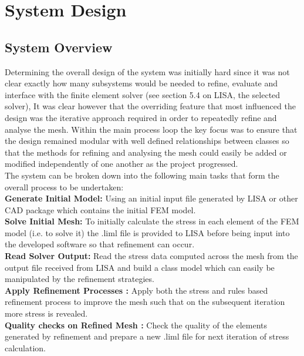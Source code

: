\section{System Design}

\subsection{System Overview}
Determining the overall design of the system was initially hard since it was not clear exactly how many subsystems would be needed to refine, evaluate and interface with the finite element solver (see section 5.4 on LISA, the selected solver), It was clear however that the overriding feature that most influenced the design was the iterative approach required in order to repeatedly refine and analyse the mesh. Within the main process loop the  key focus was to ensure that the design remained modular with well defined relationships between classes so that the methods for refining and analysing the mesh could easily be added or modified independently of one another as the project progressed. \\ 


\noindent
The system can be broken down into the following main tasks that form the overall process to be undertaken: \\ 

\noindent
\textbf{Generate Initial Model: } Using an initial input file generated by LISA or other CAD package which contains the initial FEM model. \\ 

\noindent
\textbf{Solve Initial Mesh: } To initially calculate the stress in each element of the FEM model (i.e. to solve it) the .liml file is provided to LISA before being input into the developed software so that refinement can occur. \\ 

\noindent
\textbf{Read Solver Output: } Read the stress data computed across the mesh from the output file received from LISA and build a class model which can easily be manipulated by the refinement strategies.\\ 

\noindent
\textbf{Apply Refinement Processes : } Apply both the stress and rules based  refinement process to improve the mesh such that on the subsequent iteration more stress is revealed. \\ 

\noindent
\textbf{Quality checks on Refined Mesh : } Check the quality of the elements generated by refinement and prepare a new .liml file for next iteration of stress calculation.\\


